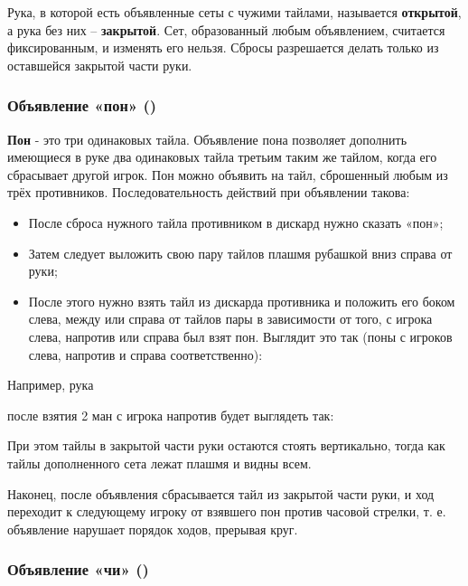 Рука, в которой есть объявленные сеты с чужими тайлами, называется \textbf{открытой}, а рука без них – \textbf{закрытой}. Сет, образованный любым объявлением, считается фиксированным, и изменять его нельзя. Сбросы разрешается делать только из оставшейся закрытой части руки.

\subsubsection{Объявление «пон» ()}

\textbf{Пон} - это три одинаковых тайла. Объявление пона позволяет дополнить имеющиеся в руке два одинаковых тайла третьим таким же тайлом, когда его сбрасывает другой игрок. Пон можно объявить на тайл, сброшенный любым из трёх противников. Последовательность действий при объявлении такова:

\begin{itemize}
	\item После сброса нужного тайла противником в дискард нужно сказать «пон»;
	\item Затем следует выложить свою пару тайлов плашмя рубашкой вниз справа от руки;
	\item После этого нужно взять тайл из дискарда противника и положить его боком слева, между или справа от тайлов пары в зависимости от того, с игрока слева, напротив или справа был взят пон. Выглядит это так (поны с игроков слева, напротив и справа соответственно):
\end{itemize}


Например, рука


после взятия 2 ман с игрока напротив будет выглядеть так:

 \hfill {}

При этом тайлы в закрытой части руки остаются стоять вертикально, тогда как тайлы дополненного сета лежат плашмя и видны всем.

Наконец, после объявления сбрасывается тайл из закрытой части руки, и ход переходит к следующему игроку от взявшего пон против часовой стрелки, т. е. объявление нарушает порядок ходов, прерывая круг.

\subsubsection{Объявление «чи» ()}

